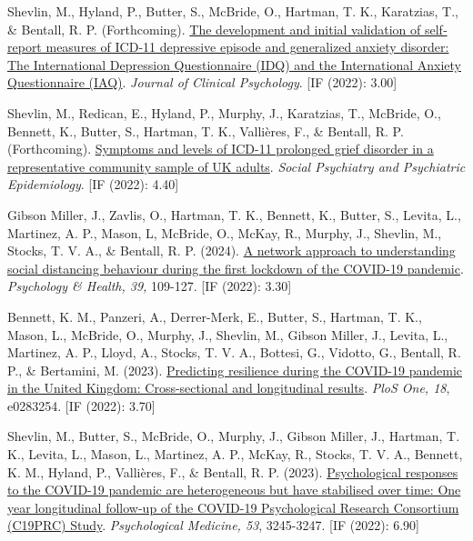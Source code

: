 \documentclass[12pt]{article}
\begin{document}
\begin{bibenum}
\item Shevlin, M., Hyland, P., Butter, S.,
		 McBride, O., Hartman, T. K., Karatzias, T., 
		 \& Bentall, R. P. (Forthcoming). 
		 \href{https://doi.org/10.1002/jclp.23446}
		 {The development and initial validation 
		 of self‐report measures of ICD‐11 
		 depressive episode and generalized 
		 anxiety disorder: The International 
		 Depression Questionnaire (IDQ) and 
		 the International Anxiety Questionnaire (IAQ)}. 
		\emph{Journal of Clinical Psychology}. 
			[IF (2022): 3.00]
		
\item Shevlin, M., Redican, E., Hyland, P., 
		 Murphy, J., Karatzias, T., McBride, O.,
		 Bennett, K., Butter, S., Hartman, T. K., 
		 Vallières, F., \& Bentall, R. P. (Forthcoming). 
		 \href{https://doi.org/10.1007/s00127-023-02469-1}
		 {Symptoms and levels of ICD-11 
		 prolonged grief disorder in a 
		 representative community sample of UK adults}.
		 \emph{Social Psychiatry and 
		 Psychiatric Epidemiology}. [IF (2022): 4.40]
			
\item Gibson Miller, J., Zavlis, O., 
		Hartman, T. K., Bennett, K., Butter, S., 
		Levita, L., Martinez, A. P., Mason, L, 
		McBride, O., McKay, R., Murphy, J., 
		Shevlin, M., Stocks, T. V. A., 
		\& Bentall, R. P. (2024). 
	\href{https://doi.org/10.1080/08870446.2022.2057497}
		{A network approach to understanding 
		social distancing behaviour during the 
		first lockdown of the COVID-19 pandemic}.
		\emph{Psychology \& Health, 39,} 109-127. [IF (2022): 3.30]

\item Bennett, K. M., Panzeri, A., 
		Derrer-Merk, E., Butter, S., Hartman, T. K.,
		Mason, L., McBride, O., Murphy, J., 
		Shevlin, M., Gibson Miller, J.,
		Levita, L., Martinez, A. P., Lloyd, A., 
		Stocks, T. V. A., Bottesi, G., 
		Vidotto, G., Bentall, R. P., \& 
		Bertamini, M. (2023). 
		\href{https://doi.org/10.1371/journal.pone.0283254}
		{Predicting resilience during the COVID-19 
		pandemic in the United Kingdom: Cross-sectional 
		and longitudinal results}.  
		\textit{PloS One, 18}, e0283254. [IF (2022): 3.70]

\item Shevlin, M., Butter, S., McBride, O., 
		Murphy, J., Gibson Miller, J., 
		Hartman, T. K., Levita, L., Mason, L., 
		Martinez, A. P., McKay, R., 
		Stocks, T. V. A., Bennett, K. M., 
		Hyland, P., Vallières, F., 
		\& Bentall, R. P. (2023). 
		\href{https://doi.org/10.1017/S0033291721004025}
		{Psychological responses to the COVID-19 
		pandemic are heterogeneous but have 
		stabilised over time: One year 
		longitudinal follow-up of the COVID-19 
		Psychological Research Consortium (C19PRC) Study}.
		\emph{Psychological Medicine, 53}, 3245-3247. 
		[IF (2022): 6.90]
		

\end{bibenum}
\end{document}
